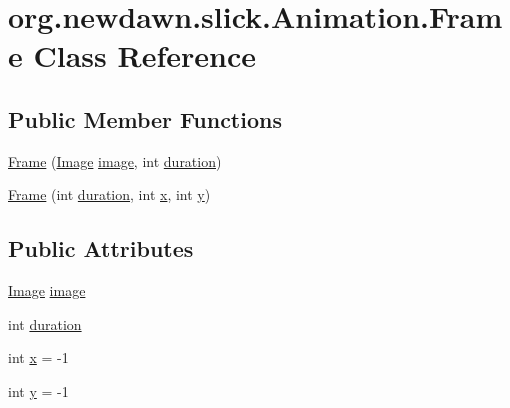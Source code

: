 \hypertarget{classorg_1_1newdawn_1_1slick_1_1_animation_1_1_frame}{}\section{org.\+newdawn.\+slick.\+Animation.\+Frame Class Reference}
\label{classorg_1_1newdawn_1_1slick_1_1_animation_1_1_frame}
\subsection*{Public Member Functions}
\begin{DoxyCompactItemize}
\item 
\mbox{\hyperlink{classorg_1_1newdawn_1_1slick_1_1_animation_1_1_frame_aeafe2cb473eec2fed2d001e5b1a74737}{Frame}} (\mbox{\hyperlink{classorg_1_1newdawn_1_1slick_1_1_image}{Image}} \mbox{\hyperlink{classorg_1_1newdawn_1_1slick_1_1_animation_1_1_frame_a6821c1e797d38a5e68a1750bcf80677a}{image}}, int \mbox{\hyperlink{classorg_1_1newdawn_1_1slick_1_1_animation_1_1_frame_ae11fed772480a8f78447d8a618e3ca8d}{duration}})
\item 
\mbox{\hyperlink{classorg_1_1newdawn_1_1slick_1_1_animation_1_1_frame_a00d0020a97ae7a979dae5056dac1ed4f}{Frame}} (int \mbox{\hyperlink{classorg_1_1newdawn_1_1slick_1_1_animation_1_1_frame_ae11fed772480a8f78447d8a618e3ca8d}{duration}}, int \mbox{\hyperlink{classorg_1_1newdawn_1_1slick_1_1_animation_1_1_frame_a41c8be82ef72f76b1989dbfe1f593800}{x}}, int \mbox{\hyperlink{classorg_1_1newdawn_1_1slick_1_1_animation_1_1_frame_ac1201c44d585ba09123c26ced60ff9c9}{y}})
\end{DoxyCompactItemize}
\subsection*{Public Attributes}
\begin{DoxyCompactItemize}
\item 
\mbox{\hyperlink{classorg_1_1newdawn_1_1slick_1_1_image}{Image}} \mbox{\hyperlink{classorg_1_1newdawn_1_1slick_1_1_animation_1_1_frame_a6821c1e797d38a5e68a1750bcf80677a}{image}}
\item 
int \mbox{\hyperlink{classorg_1_1newdawn_1_1slick_1_1_animation_1_1_frame_ae11fed772480a8f78447d8a618e3ca8d}{duration}}
\item 
int \mbox{\hyperlink{classorg_1_1newdawn_1_1slick_1_1_animation_1_1_frame_a41c8be82ef72f76b1989dbfe1f593800}{x}} = -\/1
\item 
int \mbox{\hyperlink{classorg_1_1newdawn_1_1slick_1_1_animation_1_1_frame_ac1201c44d585ba09123c26ced60ff9c9}{y}} = -\/1
\end{DoxyCompactItemize}


